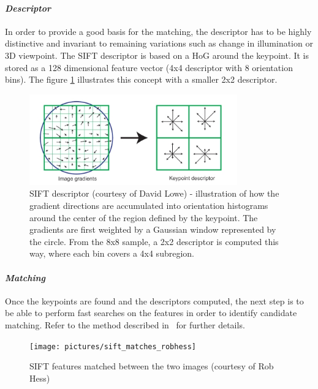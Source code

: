 \paragraph{\emph{Descriptor}}

In order to provide a good basis for the matching, the descriptor has to be highly distinctive and invariant to remaining variations such as change in illumination or 3D viewpoint. The \gls{SIFT} descriptor is based on a \gls{HoG} around the keypoint. It is stored as a 128 dimensional feature vector (4x4 descriptor with 8 orientation bins). The figure \ref{fig:sift_descriptor} illustrates this concept with a smaller 2x2 descriptor.

\begin{figure}[h]
\centering
\includegraphics[width=0.8\textwidth]{figures/sift_descriptor}
\caption{SIFT descriptor (courtesy of David Lowe) - illustration of how the gradient directions are accumulated into orientation histograms around the center of the region defined by the keypoint. The gradients are first weighted by a Gaussian window represented by the circle. From the 8x8 sample, a 2x2 descriptor is computed this way, where each bin covers a 4x4 subregion.}
\label{fig:sift_descriptor}
\end{figure}

\clearpage
\paragraph{\emph{Matching}}

Once the keypoints are found and the descriptors computed, the next step is to be able to perform fast searches on the features in order to identify candidate matching. Refer to the method described in~\cite{lowe_2004_sift} for further details.

\begin{figure}[h]
\centering
\texttt{[image: pictures/sift\_matches\_robhess]}
\caption{SIFT features matched between the two images (courtesy of Rob Hess)}
\end{figure}

